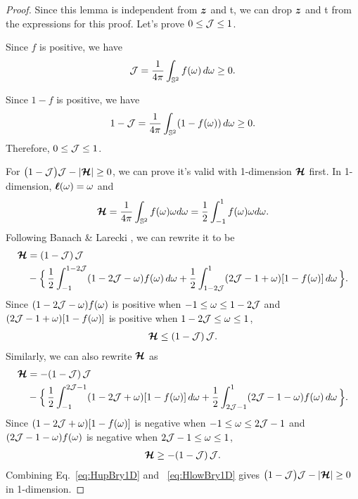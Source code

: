 \begin{proof}
  Since this lemma is independent from $\boldsymbol{z}$ and t, we can drop $\boldsymbol{z}$ and t from the expressions for this proof.
  Let's prove $0\le\mathcal{J}\le1$.
  
  Since $f$ is positive, we have
    \begin{equation}
      \mathcal{J}=\frac{1}{4\pi}\int_{\mathbb{S}^{2}}f(\omega)\,d\omega\ge0.
    \end{equation}
    
  Since $1-f$ is positive, we have
    \begin{equation}
      1-\mathcal{J}=\frac{1}{4\pi}\int_{\mathbb{S}^{2}}(1-f(\omega))\,d\omega\ge0.
    \end{equation}
    Therefore, $0\le\mathcal{J}\le1$.

    For $\big(1-\mathcal{J}\big)\mathcal{J}-|\boldsymbol{\mathcal{H}}|\ge0$, we can prove it's valid with 1-dimension $\boldsymbol{\mathcal{H}}$ first.
    In 1-dimension, $\boldsymbol{\ell}(\omega) = \omega$ and
    \begin{equation}
    \boldsymbol{\mathcal{H}}
      =\frac{1}{4\pi}\int_{\mathbb{S}^{2}}f(\omega) \omega d\omega = \frac{1}{2}\int_{-1}^{1}f(\omega) \omega d\omega.
    \end{equation}
    Following Banach \& Larecki \cite{banachLarecki_2017}, we can rewrite it to be
    \begin{align}
    \boldsymbol{\mathcal{H}}
        &=(1-\mathcal{J})\,\mathcal{J} \nonumber \\
        &-\Big\{\,
          \frac{1}{2}\int_{-1}^{1-2\mathcal{J}}(1-2\mathcal{J}-\omega)f(\omega)\,d\omega
          +\frac{1}{2}\int_{1-2\mathcal{J}}^{1}(2\mathcal{J}-1+\omega)[1-f(\omega)]\,d\omega
        \,\Big\}.
        \label{eq:momentumRewrite1}
    \end{align}
    Since $(1-2\mathcal{J}-\omega)f(\omega)$ is positive when $-1\leq\omega\leq1-2\mathcal{J}$ and $(2\mathcal{J}-1+\omega)[1-f(\omega)]$ is positive when $1-2\mathcal{J}\leq\omega\leq1$,
    \begin{align}
    \boldsymbol{\mathcal{H}} \leq (1-\mathcal{J})\,\mathcal{J}.
    \label{eq:HupBry1D}
    \end{align}
    Similarly, we can also rewrite $\boldsymbol{\mathcal{H}}$ as
    \begin{align}
     \boldsymbol{\mathcal{H}}
        &=-(1-\mathcal{J})\,\mathcal{J} \nonumber \\
        &-\Big\{\,
          \frac{1}{2}\int_{-1}^{2\mathcal{J}-1}(1-2\mathcal{J}+\omega)[1-f(\omega)]\,d\omega
          +\frac{1}{2}\int_{2\mathcal{J}-1}^{1}(2\mathcal{J}-1-\omega)f(\omega)\,d\omega
        \,\Big\}.
        \label{eq:momentumRewrite2}
    \end{align}
    Since $(1-2\mathcal{J}+\omega)[1-f(\omega)]$ is negative when $-1\leq\omega\leq2\mathcal{J}-1$ and $(2\mathcal{J}-1-\omega)f(\omega)$ is negative when $2\mathcal{J}-1\leq\omega\leq1$,
    \begin{align}
    \boldsymbol{\mathcal{H}} \geq -(1-\mathcal{J})\,\mathcal{J}.
     \label{eq:HlowBry1D}
    \end{align}
    Combining Eq.~\eqref{eq:HupBry1D} and ~\eqref{eq:HlowBry1D} gives $\big(1-\mathcal{J}\big)\mathcal{J}-|\boldsymbol{\mathcal{H}}|\ge0$ in 1-dimension.
    

\end{proof}
